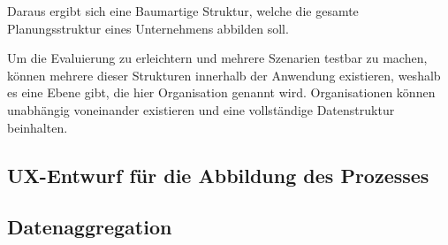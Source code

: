 Daraus ergibt sich eine Baumartige Struktur, welche die gesamte Planungsstruktur eines Unternehmens abbilden soll.

Um die Evaluierung zu erleichtern und mehrere Szenarien testbar zu machen, können mehrere dieser Strukturen innerhalb der Anwendung existieren, weshalb es eine Ebene gibt, die hier Organisation genannt wird. Organisationen können unabhängig voneinander existieren und eine vollständige Datenstruktur beinhalten.

\subsection{UX-Entwurf für die Abbildung des Prozesses}

\subsection{Datenaggregation}
